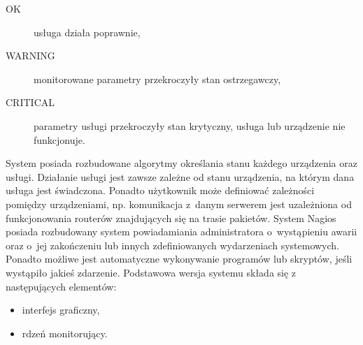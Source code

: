 \begin{description}
\item[OK] usługa działa poprawnie,
\item[WARNING] monitorowane parametry przekroczyły stan ostrzegawczy,
\item[CRITICAL] parametry usługi przekroczyły stan krytyczny, usługa
  lub urządzenie nie funkcjonuje.
\end{description}

System posiada rozbudowane algorytmy określania stanu każdego
urządzenia oraz usługi. Działanie usługi jest zawsze zależne od stanu
urządzenia, na którym dana usługa jest świadczona. Ponadto użytkownik
może definiować zależności pomiędzy urządzeniami, np. komunikacja
z~danym serwerem jest uzależniona od funkcjonowania routerów
znajdujących się na trasie pakietów. System Nagios posiada rozbudowany
system powiadamiania administratora o~wystąpieniu awarii oraz o~jej
zakończeniu lub innych zdefiniowanych wydarzeniach
systemowych. Ponadto możliwe jest automatyczne wykonywanie programów
lub skryptów, jeśli wystąpiło jakieś zdarzenie. Podstawowa wersja
systemu składa się z następujących elementów:

\begin{itemize}
\item interfejs graficzny,
\item rdzeń monitorujący.
\end{itemize}

